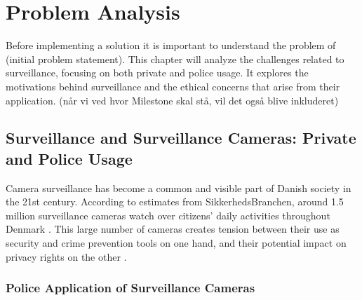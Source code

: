 \chapter{Problem Analysis}
\label{cha:problemanalysis}
Before implementing a solution it is important to understand the problem of (initial problem statement). This chapter will analyze the challenges related to surveillance, focusing on both private and police usage. It explores the motivations behind surveillance and the ethical concerns that arise from their application. (når vi ved hvor Milestone skal stå, vil det også blive inkluderet)

\section{Surveillance and Surveillance Cameras: Private and Police Usage}

Camera surveillance has become a common and visible part of Danish society in the 21st century. According to estimates from SikkerhedsBranchen, around 1.5 million surveillance cameras watch over citizens' daily activities throughout Denmark \cite{overvagningsekspert2025}. This large number of cameras creates tension between their use as security and crime prevention tools on one hand, and their potential impact on privacy rights on the other \cite{videnskab2024}.

\subsection{Police Application of Surveillance Cameras}
\label{subsec:Police_Application}


